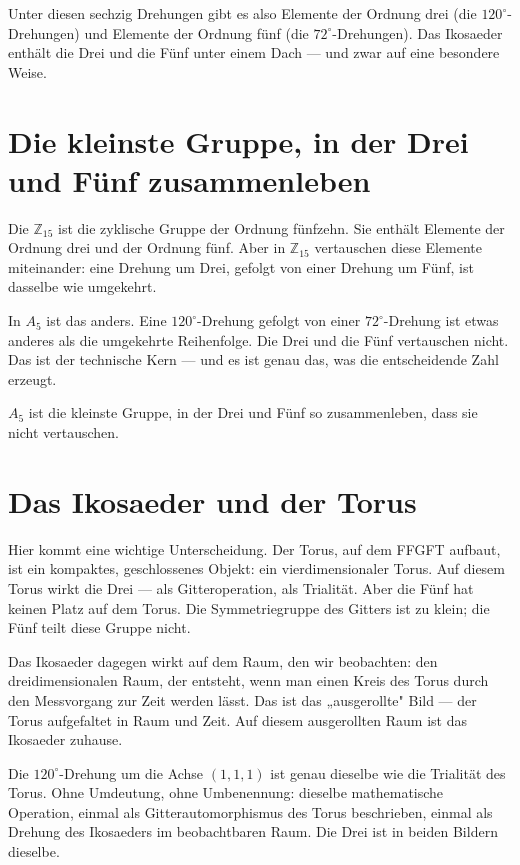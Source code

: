 \documentclass[12pt,oneside]{book}
\begin{document}
Unter diesen sechzig Drehungen gibt es also Elemente der Ordnung drei (die $120^\circ$-Drehungen) und Elemente der Ordnung fünf (die $72^\circ$-Drehungen). Das Ikosaeder enthält die Drei und die Fünf unter einem Dach — und zwar auf eine besondere Weise.

\section{Die kleinste Gruppe, in der Drei und Fünf zusammenleben}

Die $\mathbb{Z}_{15}$ ist die zyklische Gruppe der Ordnung fünfzehn. Sie enthält Elemente der Ordnung drei und der Ordnung fünf. Aber in $\mathbb{Z}_{15}$ vertauschen diese Elemente miteinander: eine Drehung um Drei, gefolgt von einer Drehung um Fünf, ist dasselbe wie umgekehrt.

In $A_5$ ist das anders. Eine $120^\circ$-Drehung gefolgt von einer $72^\circ$-Drehung ist etwas anderes als die umgekehrte Reihenfolge. Die Drei und die Fünf vertauschen nicht. Das ist der technische Kern — und es ist genau das, was die entscheidende Zahl erzeugt.

$A_5$ ist die kleinste Gruppe, in der Drei und Fünf so zusammenleben, dass sie nicht vertauschen.

\section{Das Ikosaeder und der Torus}

Hier kommt eine wichtige Unterscheidung. Der Torus, auf dem FFGFT aufbaut, ist ein kompaktes, geschlossenes Objekt: ein vierdimensionaler Torus. Auf diesem Torus wirkt die Drei — als Gitteroperation, als Trialität. Aber die Fünf hat keinen Platz auf dem Torus. Die Symmetriegruppe des Gitters ist zu klein; die Fünf teilt diese Gruppe nicht.

Das Ikosaeder dagegen wirkt auf dem Raum, den wir beobachten: den dreidimensionalen Raum, der entsteht, wenn man einen Kreis des Torus durch den Messvorgang zur Zeit werden lässt. Das ist das „ausgerollte" Bild — der Torus aufgefaltet in Raum und Zeit. Auf diesem ausgerollten Raum ist das Ikosaeder zuhause.

Die $120^\circ$-Drehung um die Achse $(1, 1, 1)$ ist genau dieselbe wie die Trialität des Torus. Ohne Umdeutung, ohne Umbenennung: dieselbe mathematische Operation, einmal als Gitterautomorphismus des Torus beschrieben, einmal als Drehung des Ikosaeders im beobachtbaren Raum. Die Drei ist in beiden Bildern dieselbe.
\end{document}
